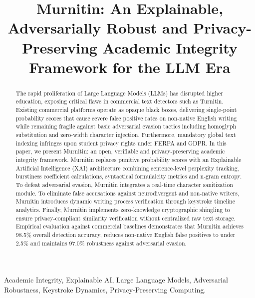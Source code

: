 \documentclass[conference]{IEEEtran}
\begin{document}
\title{Murnitin: An Explainable, Adversarially Robust and Privacy-Preserving Academic Integrity Framework for the LLM Era}

\author{
}

\maketitle

\begin{abstract}
The rapid proliferation of Large Language Models (LLMs) has disrupted higher education, exposing critical flaws in commercial text detectors such as Turnitin. Existing commercial platforms operate as opaque black boxes, delivering single-point probability scores that cause severe false positive rates on non-native English writing while remaining fragile against basic adversarial evasion tactics including homoglyph substitution and zero-width character injection. Furthermore, mandatory global text indexing infringes upon student privacy rights under FERPA and GDPR. In this paper, we present Murnitin: an open, verifiable and privacy-preserving academic integrity framework. Murnitin replaces punitive probability scores with an Explainable Artificial Intelligence (XAI) architecture combining sentence-level perplexity tracking, burstiness coefficient calculations, syntactical formulaicity metrics and n-gram entropy. To defeat adversarial evasion, Murnitin integrates a real-time character sanitization module. To eliminate false accusations against neurodivergent and non-native writers, Murnitin introduces dynamic writing process verification through keystroke timeline analytics. Finally, Murnitin implements zero-knowledge cryptographic shingling to ensure privacy-compliant similarity verification without centralized raw text storage. Empirical evaluation against commercial baselines demonstrates that Murnitin achieves 98.5\% overall detection accuracy, reduces non-native English false positives to under 2.5\% and maintains 97.0\% robustness against adversarial evasion.
\end{abstract}

\begin{IEEEkeywords}
Academic Integrity, Explainable AI, Large Language Models, Adversarial Robustness, Keystroke Dynamics, Privacy-Preserving Computing.
\end{IEEEkeywords}
\end{document}
